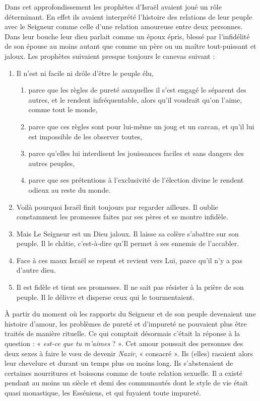  Dans cet approfondissement les prophètes d'Israël avaient joué un rôle déterminant. En effet ils avaient interprété l'histoire des relations de leur peuple avec le Seigneur comme celle d'une relation amoureuse entre deux personnes. Dans leur bouche leur dieu parlait comme un époux épris, blessé par l'infidélité de son épouse au moins autant que comme un père ou un maître tout-puissant et jaloux. 
Les prophètes suivaient presque toujours le canevas suivant :
\begin{enumerate}
\item Il n'est ni facile ni drôle d'être le peuple élu,
 \begin{enumerate}
 \item parce que les règles de pureté auxquelles il s'est engagé le séparent des autres, et le rendent infréquentable, alors qu'il voudrait qu'on l'aime, comme tout le monde,
 \item parce que ces règles sont pour lui-même un joug et un carcan, et qu'il lui est impossible de les observer toutes,
 \item parce qu'elles lui interdisent les jouissances faciles et sans dangers des autres peuples,
 \item parce que ses prétentions à l'exclusivité de l'élection divine le rendent odieux au reste du monde. 
 \end{enumerate}
\item Voilà pourquoi Israël finit toujours par regarder ailleurs. Il oublie constamment les promesses faites par ses pères et se montre infidèle. 
\item Mais Le Seigneur est un Dieu jaloux. Il laisse sa colère s'abattre sur son peuple. Il le châtie, c'est-à-dire qu'Il permet à ses ennemis de l'accabler. 
\item Face à ces maux Israël se repent et revient vers Lui, parce qu'il n'y a pas d'autre dieu.
\item Il est fidèle et tient ses promesses. Il ne sait pas résister à la prière de son peuple. Il le délivre et disperse ceux qui le tourmentaient.
\end{enumerate}

 À partir du moment où les rapports du Seigneur et de son peuple devenaient une histoire d'amour, les problèmes de pureté et d'impureté ne pouvaient plus être traités de manière rituelle. Ce qui comptait désormais c'était la réponse à la question : « \emph{est-ce que tu m'aimes} ? ». Cet amour poussait des personnes des deux sexes à faire le vœu de devenir \emph{Nazir}, « consacré ». Ils (elles) rasaient alors leur chevelure et durant un temps plus ou moins long. Ils s'abstenaient de certaines nourritures et boissons comme de toute relation sexuelle. Il a existé pendant au moins un siècle et demi des communautés dont le style de vie était quasi monastique, les Esséniens, et qui fuyaient toute impureté. 

